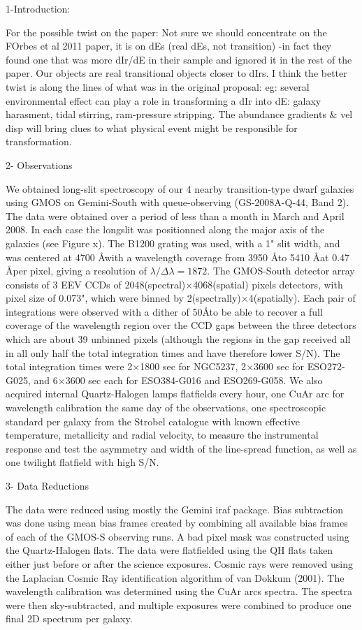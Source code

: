 
1-Introduction:

For the possible twist on the paper: 
Not sure we should concentrate on the FOrbes et al 2011 paper, it is on dEs 
(real dEs, not transition) -in fact they found one that was more dIr/dE in their sample and 
ignored it in the rest of the paper. Our objects are real transitional objects closer to dIrs.
I think the better twist is along the lines of what was in the original proposal:
eg: several environmental effect can play a role in transforming a dIr into dE: galaxy harasment, tidal stirring, ram-pressure stripping. The abundance gradients & vel disp will bring clues to what physical event might be responsible for transformation.

2- Observations

We obtained long-slit spectroscopy of our 4 nearby transition-type dwarf galaxies using GMOS 
on Gemini-South with queue-observing (GS-2008A-Q-44, Band 2). The data were obtained over 
a period of less than a month in March and April 2008. In each case the longslit was positionned 
along the major axis of the galaxies (see Figure x).
The B1200 grating was used, with a 1" slit width, and was centered at 4700 \AA with 
a wavelength coverage from 3950 \AA to 5410 \AA at 0.47 \AA per pixel, giving a resolution 
of $\lambda/\Delta \lambda = 1872$.
The GMOS-South detector array consists of 3 EEV CCDs of 2048(spectral)$\times$4068(spatial) pixels 
detectors, with pixel size of 0.073", which were binned by 2(spectrally)$\times$4(spatially).
Each pair of integrations were observed with a dither of 50\AA to be able to recover a full coverage 
of the wavelength region over the CCD gaps between the three detectors which are about 39 unbinned pixels
 (although the regions in the gap received all in all only half the total integration times and have 
therefore lower S/N).
The total integration times were 2$\times$1800 sec for NGC5237, 2$\times$3600 sec for 
ESO272-G025, and 6$\times$3600 sec each for ESO384-G016 and ESO269-G058. We also acquired internal 
Quartz-Halogen lamps flatfields every hour, one CuAr arc for wavelength calibration the same day of the observations, 
one spectroscopic standard per galaxy from the Strobel catalogue with known effective 
temperature, metallicity and radial velocity, to measure the instrumental response and test 
the asymmetry and width of the line-spread function, as well as one twilight flatfield with high S/N.

3- Data Reductions

The data were reduced using mostly the Gemini iraf package. Bias subtraction was done using 
mean bias frames created by combining all available bias frames of each of the GMOS-S observing runs. 
A bad pixel mask was constructed using the Quartz-Halogen flats. The data were flatfielded using 
the QH flats taken either just before or after the science exposures. Cosmic rays were removed using the 
Laplacian Cosmic Ray identification algorithm of van Dokkum (2001). The wavelength calibration was 
determined using the CuAr arcs spectra. The spectra were then sky-subtracted, and multiple exposures were 
combined to produce one final 2D spectrum per galaxy.
